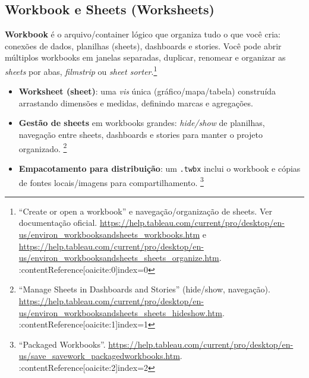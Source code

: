 \subsection{Workbook e Sheets (Worksheets)}
\textbf{Workbook} é o arquivo/container lógico que organiza tudo o que você cria: conexões de dados, planilhas (sheets), dashboards e stories. Você pode abrir múltiplos workbooks em janelas separadas, duplicar, renomear e organizar as \textit{sheets} por abas, \textit{filmstrip} ou \textit{sheet sorter}.\footnote{``Create or open a workbook'' e navegação/organização de sheets. Ver documentação oficial. \url{https://help.tableau.com/current/pro/desktop/en-us/environ_workbooksandsheets_workbooks.htm} e \url{https://help.tableau.com/current/pro/desktop/en-us/environ_workbooksandsheets_sheets_organize.htm}. :contentReference[oaicite:0]{index=0}}
\begin{itemize}[leftmargin=*]
  \item \textbf{Worksheet (sheet)}: uma \textit{vis} única (gráfico/mapa/tabela) construída arrastando dimensões e medidas, definindo marcas e agregações.
  \item \textbf{Gestão de sheets} em workbooks grandes: \textit{hide/show} de planilhas, navegação entre sheets, dashboards e stories para manter o projeto organizado. \footnote{``Manage Sheets in Dashboards and Stories'' (hide/show, navegação). \url{https://help.tableau.com/current/pro/desktop/en-us/environ_workbooksandsheets_sheets_hideshow.htm}. :contentReference[oaicite:1]{index=1}}
  \item \textbf{Empacotamento para distribuição}: um \texttt{.twbx} inclui o workbook e cópias de fontes locais/imagens para compartilhamento. \footnote{``Packaged Workbooks''. \url{https://help.tableau.com/current/pro/desktop/en-us/save_savework_packagedworkbooks.htm}. :contentReference[oaicite:2]{index=2}}
\end{itemize}

